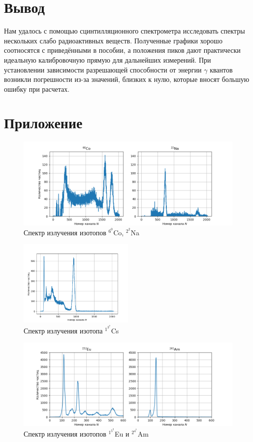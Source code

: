 \documentclass[a4paper,12pt]{article} %
\begin{document}
\section{Вывод}
Нам удалось с помощью сцинтилляционного спектрометра исследовать спектры нескольких слабо радиоактивных веществ. Полученные графики хорошо соотносятся с приведёнными в пособии, а положения пиков дают практически идеальную калибровочную прямую для дальнейших измерений. При установлении зависимости разрешающей способности от энергии $\gamma$ квантов возникли погрешности из-за значений, близких к нулю, которые вносят большую ошибку при расчетах.

\newpage
\section{Приложение}

\begin{figure}[h]
    \centering
    \includegraphics[width=\textwidth]{Na22Co60.png}
    \caption{Спектр излучения изотопов $^6^0$Co, $^2^2$Na}
    \label{fig:CoNa}
\end{figure}
\begin{figure}[h]
    \centering
    \includegraphics[width=0.50\textwidth]{Cs137.png}
    \caption{Спектр излучения изотопа $^1^3^7$Cs} 
    \label{fig:Cs}
\end{figure}
\begin{figure}[h]
    \centering
    \includegraphics[width=\textwidth]{Eu152Am241.png}
    \caption{Спектр излучения изотопов $^1^5^2$Eu и $^2^4^1$Am}
    \label{fig:EuAm}
\end{figure}
\end{document}

